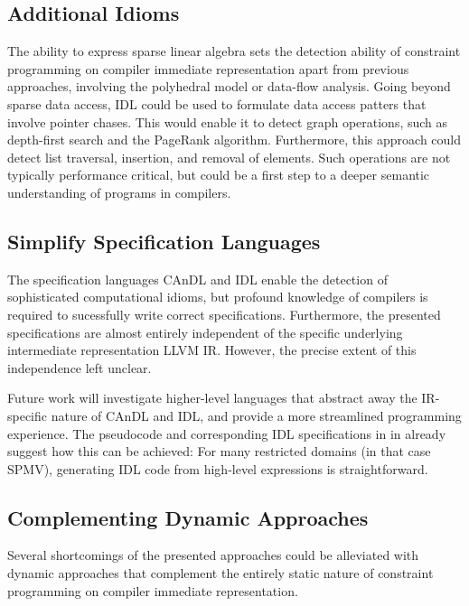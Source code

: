     \subsection{Additional Idioms}

    The ability to express sparse linear algebra sets the detection ability of
    constraint programming on compiler immediate representation apart from
    previous approaches, involving the polyhedral model or data-flow analysis.
    Going beyond sparse data access, IDL could be used to formulate data access
    patters that involve pointer chases.
    This would enable it to detect graph operations, such as depth-first search
    and the PageRank algorithm.
    Furthermore, this approach could detect list traversal, insertion, and
    removal of elements.
    Such operations are not typically performance critical, but could be a first
    step to a deeper semantic understanding of programs in compilers.

\subsection{Simplify Specification Languages}

    The specification languages CAnDL and IDL enable the detection of
    sophisticated computational idioms, but profound knowledge of compilers is
    required to sucessfully write correct specifications. 
    Furthermore, the presented specifications are almost entirely independent of
    the specific underlying intermediate representation LLVM IR.
    However, the precise extent of this independence left unclear.

    Future work will investigate higher-level languages that abstract away the
    IR-specific nature of CAnDL and IDL, and provide a more streamlined
    programming experience.
    The pseudocode and corresponding IDL specifications in
     in  already
    suggest how this can be achieved:
    For many restricted domains (in that case SPMV), generating IDL code from
    high-level expressions is straightforward.

\subsection{Complementing Dynamic Approaches}

    Several shortcomings of the presented approaches could be alleviated with
    dynamic approaches that complement the entirely static nature of constraint
    programming on compiler immediate representation.

